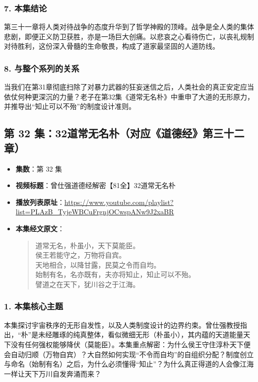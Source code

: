 \subsubsection{7. 本集结论}
第三十一章将人类对待战争的态度升华到了哲学神殿的顶峰。战争是全人类的集体悲剧，即便正义防卫获胜，亦是一场巨大创痛。以悲哀之心看待伤亡，以丧礼规制对待胜利，这份深入骨髓的生命敬畏，构成了道家最坚固的人道防线。

\subsubsection{8. 与整个系列的关系}
当我们在第31章彻底扫除了对暴力武器的狂妄迷信之后，人类社会的真正安定应当依仗何种更深沉的力量？老子在第32集《道常无名朴》中重申了大道的无形原力，并推导出“知止可以不殆”的制度设计准则。

\clearpage

\subsection{第 32 集：32道常无名朴（对应《道德经》第三十二章）}
\label{sec:ep32}

\begin{itemize}
    \item \textbf{集数}：第 32 集
    \item \textbf{视频标题}：曾仕强道德经解密【81全】32道常无名朴
    \item \textbf{播放列表原址}：\url{https://www.youtube.com/playlist?list=PLAzB_TyjeWBCuFrgnjOCwspANw9J2xaBR}
    \item \textbf{本集经文原文}：
    \begin{quote}\kaishu
    道常无名，朴虽小，天下莫能臣。\\
    侯王若能守之，万物将自宾。\\
    天地相合，以降甘露，民莫之令而自均。\\
    始制有名，名亦既有，夫亦将知止，知止可以不殆。\\
    譬道之在天下，犹川谷之于江海。
    \end{quote}
\end{itemize}

\subsubsection{1. 本集核心主题}
本集探讨宇宙秩序的无形自发性，以及人类制度设计的边界约束。曾仕强教授指出，“朴”是未经雕琢的纯真整体，看似微细无形（朴虽小），其内蕴的天道能量天下没有任何强权能够降伏（莫能臣）。本集重点解密：为什么侯王守住淳朴天下便会自动归顺（万物自宾）？大自然如何实现“不令而自均”的自组织分配？制度创立与命名（始制有名）之后，为什么必须懂得“知止”？为什么真正得道的人会像江海一样让天下万川自发奔涌而来？

